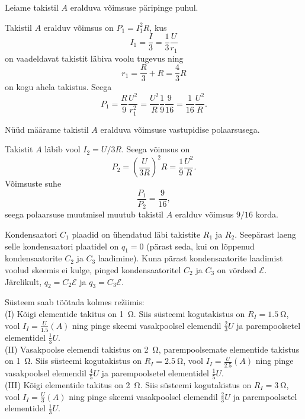 \documentclass[10pt]{article}
\begin{document}
{Leiame takistil $A$ eralduva võimsuse päripinge puhul. 

Takistil $A$ eralduv võimsus on $P_1 = I_1^2R$, kus
\[
I_1 = \frac{I}{3} = \frac{1}{3} \frac{U}{r_1}
\]
on vaadeldavat takistit läbiva voolu tugevus ning
\[
r_1 = \frac{R}{3} + R = \frac{4}{3} R
\]
on kogu ahela takistus. Seega
\[
P_1=\frac{R}{9} \frac{U^{2}}{r_{1}^{2}}=\frac{U^{2}}{R} \frac{1}{9} \frac{9}{16}=\frac{1}{16} \frac{U^{2}}{R}.
\]

Nüüd määrame takistil $A$ eralduva võimsuse vastupidise polaarsusega. 

Takistit $A$ läbib vool $I_2 = U/3R$. Seega võimsus on
\[
P_{2}=\left(\frac{U}{3 R}\right)^{2} R=\frac{1}{9} \frac{U^{2}}{R}.
\]
Võimsuste suhe
\[
\frac{P_1}{P_2} = \frac{9}{16},
\]
seega polaarsuse muutmisel muutub takistil $A$ eralduv võimsus $9/16$ korda.
\probend
\bigskip


\solu
Kondensaatori $C_1$ plaadid on ühendatud läbi takistite $R_1$ ja $R_2$. Seepärast laeng selle kondensaatori plaatidel on $q_1 = 0$ (pärast seda, kui on lõppenud kondensaatorite $C_2$ ja $C_3$ laadimine). Kuna pärast kondensaatorite laadimist voolud skeemis ei kulge, pinged kondensaatoritel $C_2$ ja $C_3$ on võrdsed $\mathcal E$. Järelikult, $q_2 = C_2\mathcal E$ ja $q_3 = C_3\mathcal E$.
\probend
\bigskip


\solu
Süsteem saab töötada kolmes režiimis:\\
(I) Kõigi elementide takitus on \SI{1}{\ohm}. Siis süsteemi kogutakistus on $R_I = \SI{1,5}{\ohm}$, vool $I_I = \frac{U}{\num{1,5}}(\si{A})$ ning pinge skeemi vasakpoolsel elemendil $\frac{2}{3}U$ ja parempoolsetel elementidel $\frac 13U$.\\
(II) Vasakpoolse elemendi takistus on \SI{2}{\ohm}, parempoolsemate elementide takistus on \SI{1}{\ohm}. Siis süsteemi kogutakistus on $R_I = \SI{2,5}{\ohm}$, vool $I_I = \frac{U}{\num{2,5}}(\si{A})$ ning pinge vasakpoolsel elemendil $\frac 45U$ ja parempoolsetel elementidel $\frac 15U$.\\
(III) Kõigi elementide takitus on \SI{2}{\ohm}. Siis süsteemi kogutakistus on $R_I = \SI{3}{\ohm}$, vool $I_I = \frac U3(A)$ ning pinge skeemi vasakpoolsel elemendil $\frac 23U$ ja parempoolsetel elementidel $\frac 13U$.

}
\end{document}
